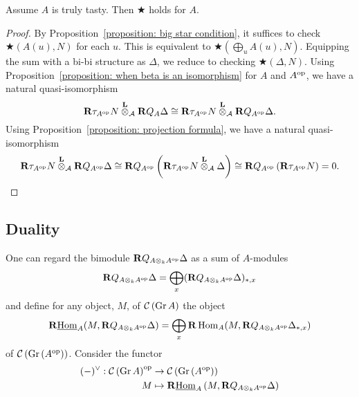 \documentclass[dissertation.tex]{subfiles}
\begin{document}
\begin{proposition} \label{proposition: vanishing of tensor}
  Assume \(A\) is truly tasty. Then \(\bigstar\) holds for \(A\).
\end{proposition}

\begin{proof}
  By Proposition~\ref{proposition: big star condition}, it suffices to check \(\bigstar(A(u),N)\) for each \(u\). This is equivalent to \(\bigstar(\bigoplus_u A(u),N)\). Equipping the sum with a bi-bi structure as \(\Delta\), we reduce to checking \(\bigstar(\Delta,N)\). Using Proposition~\ref{proposition: when beta is an isomorphism} for \(A\) and \(A^{\operatorname{op}}\), we have a natural quasi-isomorphism
  \begin{displaymath}
    \mathbf{R}\tau_{A^{\operatorname{op}}} N \overset{\mathbf{L}}{\otimes}_{\mathcal A} \mathbf{R}Q_A \Delta \cong \mathbf{R}\tau_{A^{\operatorname{op}}} N \overset{\mathbf{L}}{\otimes}_{\mathcal A} \mathbf{R}Q_{A^{\operatorname{op}}} \Delta.
  \end{displaymath}
  Using Proposition~\ref{proposition: projection formula}, we have a natural quasi-isomorphism
  \begin{displaymath}
    \mathbf{R}\tau_{A^{\operatorname{op}}} N \overset{\mathbf{L}}{\otimes}_{\mathcal A} \mathbf{R}Q_{A^{\operatorname{op}}} \Delta \cong \mathbf{R}Q_{A^{\operatorname{op}}} \left( \mathbf{R}\tau_{A^{\operatorname{op}}} N \overset{\mathbf{L}}{\otimes}_{\mathcal A} \Delta  \right) \cong \mathbf{R}Q_{A^{\operatorname{op}}} \left( \mathbf{R}\tau_{A^{\operatorname{op}}} N \right) = 0.
  \end{displaymath}
\end{proof}

\subsection{Duality}

One can regard the bimodule \(\mathbf{R}Q_{A \otimes_k A^{\operatorname{op}}}\Delta\) as a sum of \(A\)-modules
\[\mathbf{R}Q_{A \otimes_k A^{\operatorname{op}}}\Delta = \bigoplus_{x} (\mathbf{R}Q_{A \otimes_k A^{\operatorname{op}}}\Delta)_{\ast,x}\]
and define for any object, \(M\), of \(\mathcal{C}\left(\operatorname{Gr}A\right)\) the object
\[\mathbf{R}\underline{\operatorname{Hom}}_A(M, \mathbf{R}Q_{A \otimes_k A^{\operatorname{op}}}\Delta) = \bigoplus_x \mathbf{R}\operatorname{Hom}_A(M, \mathbf{R}Q_{A \otimes_k A^{\operatorname{op}}}\Delta_{\ast,x})\]
of \(\mathcal{C}\left(\operatorname{Gr}\left(A^{{\operatorname{op}}}\right)\right)\).
Consider the functor
\begin{align*}
  (-)^{\vee} : \mathcal{C}\left(\operatorname{Gr}A\right)^{\operatorname{op}} & \to \mathcal{C}\left(\operatorname{Gr}\left(A^{{\operatorname{op}}}\right)\right) \\
  M & \mapsto \mathbf{R}\underline{\operatorname{Hom}}_A \left( M , \mathbf{R}Q_{A \otimes_k A^{\operatorname{op}}} \Delta \right)
\end{align*}
\end{document}
